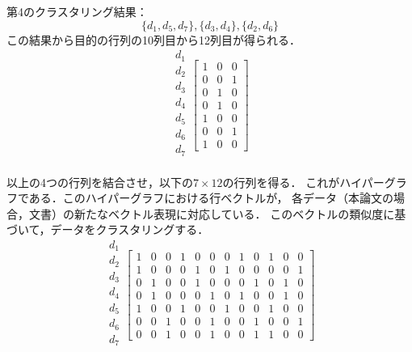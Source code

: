 \documentclass[japanese]{jnlp_1.3e}
\begin{document}
第4のクラスタリング結果：
\[
\{ d_1,d_5,d_7 \}, \{ d_3,d_4 \}, \{ d_2, d_6 \}
\]
この結果から目的の行列の10列目から12列目が得られる．
\[
                        \begin{array}{c}
                                 d_1\\
                                 d_2\\
                                 d_3\\
                                 d_4\\
                                 d_5\\
                                 d_6\\
                                 d_7\\
                        \end{array}
\left[
                        \begin{array}{rrr}
                                 1& 0& 0\\
                                 0& 0& 1\\
                                 0& 1& 0\\
                                 0& 1& 0\\
                                 1& 0& 0\\
                                 0& 0& 1\\
                                 1& 0& 0
                        \end{array}
\right]
\]

以上の4つの行列を結合させ，以下の\( 7 \times 12 \)の行列を得る．
これがハイパーグラフである．このハイパーグラフにおける行ベクトルが，
各データ（本論文の場合，文書）の新たなベクトル表現に対応している．
このベクトルの類似度に基づいて，データをクラスタリングする．
\[
                        \begin{array}{c}
                                 d_1\\
                                 d_2\\
                                 d_3\\
                                 d_4\\
                                 d_5\\
                                 d_6\\
                                 d_7\\
                        \end{array}
\left[
                        \begin{array}{rrrrrrrrrrrr}
 1& 0& 0 &  1& 0& 0 & 0& 1& 0 & 1& 0& 0 \\
 1& 0& 0 &  0& 1& 0 & 1& 0& 0 & 0& 0& 1 \\
 0& 1& 0 &  0& 1& 0 & 0& 0& 1 & 0& 1& 0 \\
 0& 1& 0 &  0& 0& 1 & 0& 1& 0 & 0& 1& 0 \\
 1& 0& 0 &  1& 0& 0 & 1& 0& 0 & 1& 0& 0 \\
 0& 0& 1 &  0& 0& 1 & 0& 0& 1 & 0& 0& 1 \\
 0& 0& 1 &  0& 0& 1 & 0& 0& 1 & 1& 0& 0
                        \end{array}
\right]
\]
\end{document}
